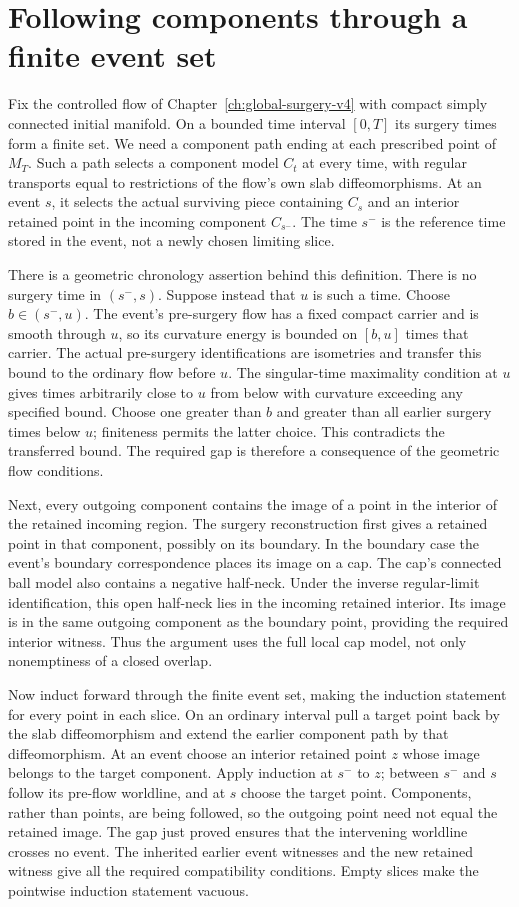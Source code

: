 \section{Following components through a finite event set}
\label{sec:filling-component-ancestry}

Fix the controlled flow of Chapter~\ref{ch:global-surgery-v4} with compact
simply connected initial manifold. On a bounded time interval $[0,T]$
its surgery times form a finite set. We need a component path ending at
each prescribed point of $M_T$. Such a path selects a component model
$C_t$ at every time, with regular transports equal to restrictions of the
flow's own slab diffeomorphisms. At an event $s$, it selects the actual
surviving piece containing $C_s$ and an interior retained point in the
incoming component $C_{s^-}$. The time $s^-$ is the reference time stored
in the event, not a newly chosen limiting slice.

There is a geometric chronology assertion behind this definition.
There is no surgery time in $(s^-,s)$. Suppose instead that $u$ is such
a time. Choose $b\in(s^-,u)$. The event's pre-surgery flow has a fixed
compact carrier and is smooth through $u$, so its curvature energy is
bounded on $[b,u]$ times that carrier. The actual pre-surgery
identifications are isometries and transfer this bound to the ordinary
flow before $u$. The singular-time maximality condition at $u$ gives
times arbitrarily close to $u$ from below with curvature exceeding any
specified bound. Choose one greater than $b$ and greater than all earlier
surgery times below $u$; finiteness permits the latter choice. This
contradicts the transferred bound. The required gap is therefore a
consequence of the geometric flow conditions.

Next, every outgoing component contains the image of a point in the
interior of the retained incoming region. The surgery reconstruction
first gives a retained point in that component, possibly on its boundary.
In the boundary case the event's boundary correspondence places its image
on a cap. The cap's connected ball model also contains a negative
half-neck. Under the inverse regular-limit identification, this open
half-neck lies in the incoming retained interior. Its image is in the
same outgoing component as the boundary point, providing the required
interior witness. Thus the argument uses the full local cap model, not
only nonemptiness of a closed overlap.

Now induct forward through the finite event set, making the induction
statement for every point in each slice. On an ordinary interval pull
a target point back by the slab diffeomorphism and extend the earlier
component path by that diffeomorphism. At an event choose an interior
retained point $z$ whose image belongs to the target component. Apply
induction at $s^-$ to $z$; between $s^-$ and $s$ follow its pre-flow
worldline, and at $s$ choose the target point. Components, rather than
points, are being followed, so the outgoing point need not equal the
retained image. The gap just proved ensures that the intervening
worldline crosses no event. The inherited earlier event witnesses and
the new retained witness give all the required compatibility conditions.
Empty slices make the pointwise induction statement vacuous.

